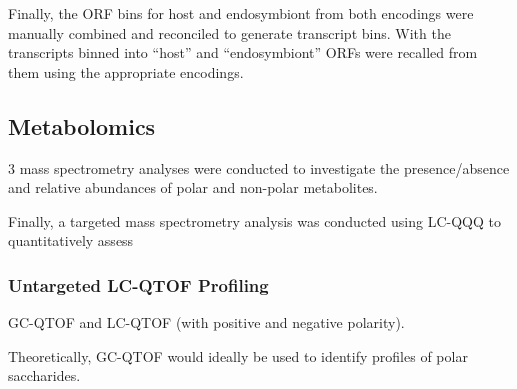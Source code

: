 Finally, the ORF bins for host and endosymbiont 
from both encodings were manually combined and reconciled
to generate transcript bins.  With the transcripts binned into
``host'' and ``endosymbiont'' ORFs were recalled from them using the appropriate
encodings. 




\subsection{Metabolomics}

3 mass spectrometry analyses were conducted to investigate the presence/absence
and relative abundances of polar and non-polar metabolites.

Finally, a targeted mass spectrometry analysis was conducted using
LC-QQQ to quantitatively assess 



\subsubsection{Untargeted LC-QTOF Profiling}
GC-QTOF and LC-QTOF (with positive and negative polarity).


Theoretically, GC-QTOF would ideally be used to identify profiles of polar
saccharides. 



%
%
%
%
%
%
%
%

%
%
%
%
%
%
%

